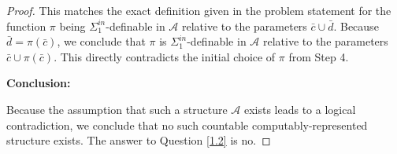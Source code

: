 \documentclass[12pt]{article}
\begin{document}
\begin{proof}
This matches the exact definition given in the problem statement for the function $\pi$ being $\Sigma^{in}_1$-definable in $\mathcal{A}$ relative to the parameters $\bar{c} \cup \bar{d}$. 
Because $\bar{d} = \pi(\bar{c})$, we conclude that $\pi$ is $\Sigma^{in}_1$-definable in $\mathcal{A}$ relative to the parameters $\bar{c} \cup \pi(\bar{c})$. 
This directly contradicts the initial choice of $\pi$ from Step 4. 

\textbf{Conclusion:}

Because the assumption that such a structure $\mathcal{A}$ exists leads to a logical contradiction, we conclude that no such countable computably-represented structure exists. The answer to Question \ref{1.2} is no.
\end{proof}
\end{document}
